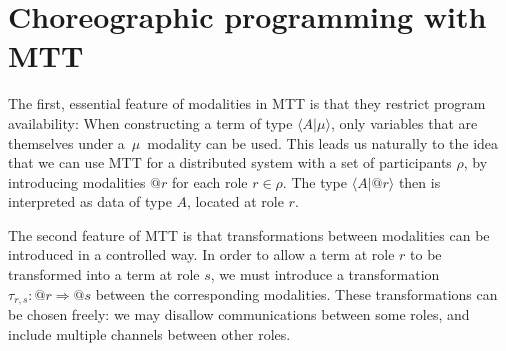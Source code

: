 \documentclass{scrartcl}
\theoremstyle{definition}
\theoremstyle{plain}
\begin{document}

\section{Choreographic programming with MTT}
The first, essential feature of modalities in MTT is that they restrict program
availability: When constructing a term of type $\langle A | \mu \rangle$, only
variables that are themselves under a~$\mu$~modality can be used. This leads us
naturally to the idea that we can use MTT for a distributed system with a set
of participants $\rho$, by introducing modalities $@r$ for each role $r \in
\rho$. The type $\langle A | @r \rangle$ then is interpreted as data of type
$A$, located at role $r$.

The second feature of MTT is that transformations between modalities can be
introduced in a controlled way. In order to allow a term at role $r$ to be
transformed into a term at role $s$, we must introduce a transformation
$\tau_{r,s} : @r \Rightarrow @s$ between the corresponding modalities. These
transformations can be chosen freely: we may disallow communications between
some roles, and include multiple channels between other roles.


\end{document}
